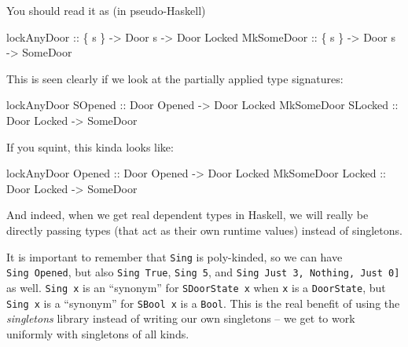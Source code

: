\documentclass[]{article}
\newenvironment{Shaded}{}{}
\newcommand{\DataTypeTok}[1]{\textcolor[rgb]{0.56,0.13,0.00}{#1}}
\newcommand{\NormalTok}[1]{#1}
\newcommand{\OtherTok}[1]{\textcolor[rgb]{0.00,0.44,0.13}{#1}}
\begin{document}
You should read it as (in pseudo-Haskell)

\begin{Shaded}
\begin{Highlighting}[]
\OtherTok{lockAnyDoor ::}\NormalTok{ \{ s \} }\OtherTok{{-}\textgreater{}} \DataTypeTok{Door}\NormalTok{ s }\OtherTok{{-}\textgreater{}} \DataTypeTok{Door} \DataTypeTok{\textquotesingle{}Locked}
\DataTypeTok{MkSomeDoor}\OtherTok{  ::}\NormalTok{ \{ s \} }\OtherTok{{-}\textgreater{}} \DataTypeTok{Door}\NormalTok{ s }\OtherTok{{-}\textgreater{}} \DataTypeTok{SomeDoor}
\end{Highlighting}
\end{Shaded}

This is seen clearly if we look at the partially applied type signatures:

\begin{Shaded}
\begin{Highlighting}[]
\NormalTok{lockAnyDoor }\DataTypeTok{SOpened}\OtherTok{ ::} \DataTypeTok{Door} \DataTypeTok{\textquotesingle{}Opened} \OtherTok{{-}\textgreater{}} \DataTypeTok{Door} \DataTypeTok{\textquotesingle{}Locked}
\DataTypeTok{MkSomeDoor}  \DataTypeTok{SLocked}\OtherTok{ ::} \DataTypeTok{Door} \DataTypeTok{\textquotesingle{}Locked} \OtherTok{{-}\textgreater{}} \DataTypeTok{SomeDoor}
\end{Highlighting}
\end{Shaded}

If you squint, this kinda looks like:

\begin{Shaded}
\begin{Highlighting}[]
\NormalTok{lockAnyDoor }\DataTypeTok{\textquotesingle{}Opened}\OtherTok{ ::} \DataTypeTok{Door} \DataTypeTok{\textquotesingle{}Opened} \OtherTok{{-}\textgreater{}} \DataTypeTok{Door} \DataTypeTok{\textquotesingle{}Locked}
\DataTypeTok{MkSomeDoor}  \DataTypeTok{\textquotesingle{}Locked}\OtherTok{ ::} \DataTypeTok{Door} \DataTypeTok{\textquotesingle{}Locked} \OtherTok{{-}\textgreater{}} \DataTypeTok{SomeDoor}
\end{Highlighting}
\end{Shaded}

And indeed, when we get real dependent types in Haskell, we will really be
directly passing types (that act as their own runtime values) instead of
singletons.

It is important to remember that \texttt{Sing} is poly-kinded, so we can have
\texttt{Sing\ \textquotesingle{}Opened}, but also
\texttt{Sing\ \textquotesingle{}True}, \texttt{Sing\ 5}, and
\texttt{Sing\ \textquotesingle{}{[}\textquotesingle{}Just\ 3,\ \textquotesingle{}Nothing,\ \textquotesingle{}Just\ 0{]}}
as well. \texttt{Sing\ x} is an ``synonym'' for \texttt{SDoorState\ x} when
\texttt{x} is a \texttt{DoorState}, but \texttt{Sing\ x} is a ``synonym'' for
\texttt{SBool\ x} is a \texttt{Bool}. This is the real benefit of using the
\emph{singletons} library instead of writing our own singletons -- we get to
work uniformly with singletons of all kinds.
\end{document}
